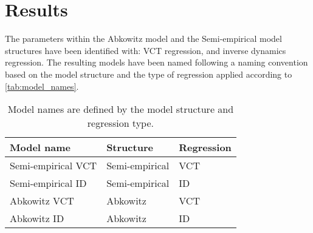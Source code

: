 \section{Results}
\label{sec:results}
The parameters within the Abkowitz model and the Semi-empirical model structures have been identified with: VCT regression, and inverse dynamics regression. The resulting models have been named following a  naming convention based on the model structure and the type of regression applied according to \autoref{tab:model_names}.
\begin{table}[h!]
    \caption{Model names are defined by the model structure and regression type.}
    \label{tab:model_names}
    \centering
    \begin{tabular}{l l l}
        Model name & Structure & Regression \\
        \hline
        Semi-empirical VCT & Semi-empirical & VCT \\
        Semi-empirical ID & Semi-empirical & ID \\
        Abkowitz VCT & Abkowitz & VCT \\
        Abkowitz ID & Abkowitz & ID \\
    \end{tabular}
\end{table}




